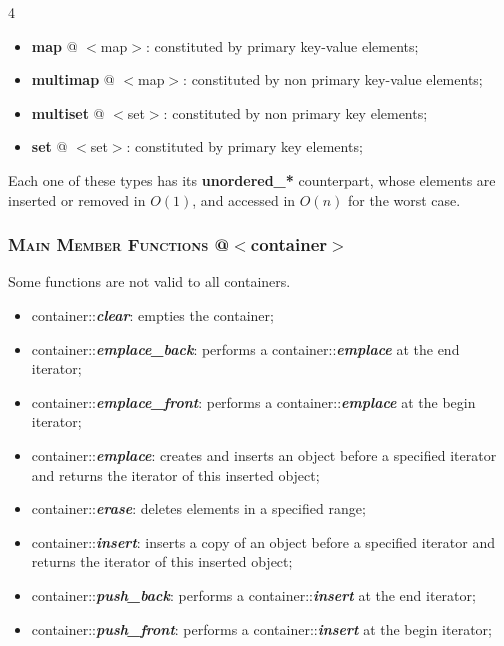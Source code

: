 \documentclass[10pt]{article}
\begin{document}
\begin{multicols*}{4}
{\begin{itemize}[leftmargin=*,topsep=0.25pt]
  \setlength\itemsep{-1.8pt}
	\item \textbf{map} @ $<$map$>$: constituted by primary key-value elements;
	\item \textbf{multimap} @ $<$map$>$: constituted by non primary key-value elements;  
	\item \textbf{multiset} @ $<$set$>$: constituted by non primary key elements;
	\item \textbf{set} @ $<$set$>$: constituted by primary key elements;
\end{itemize}
\noindent
Each one of these types has its \textbf{unordered\_*} counterpart, whose elements are inserted or removed in $O(1)$, and accessed in $O(n)$ for the worst case. 

\subsubsection*{\textsc{Main Member Functions}  @$<$container$>$} 
\noindent Some functions are not valid to all containers.

\begin{itemize}[leftmargin=*,topsep=0.25pt]
  \setlength\itemsep{-1.8pt}
	\item container::\emph{\textbf{clear}}: empties the container;
	\item container::\emph{\textbf{emplace\_back}}: performs a container::\emph{\textbf{emplace}} at the end iterator;
	\item container::\emph{\textbf{emplace\_front}}: performs a container::\emph{\textbf{emplace}} at the begin iterator;
	\item container::\emph{\textbf{emplace}}: creates and inserts an object before a specified iterator and returns the iterator of this inserted object;
	\item container::\emph{\textbf{erase}}: deletes elements in a specified range;
	\item container::\emph{\textbf{insert}}: inserts a copy of an object before a specified iterator and returns the iterator of this inserted object;
	\item container::\emph{\textbf{push\_back}}: performs a container::\emph{\textbf{insert}} at the end iterator;
	\item container::\emph{\textbf{push\_front}}: performs a container::\emph{\textbf{insert}} at the begin iterator;
\end{itemize}
\noindent

}
\end{multicols*}
\end{document}
